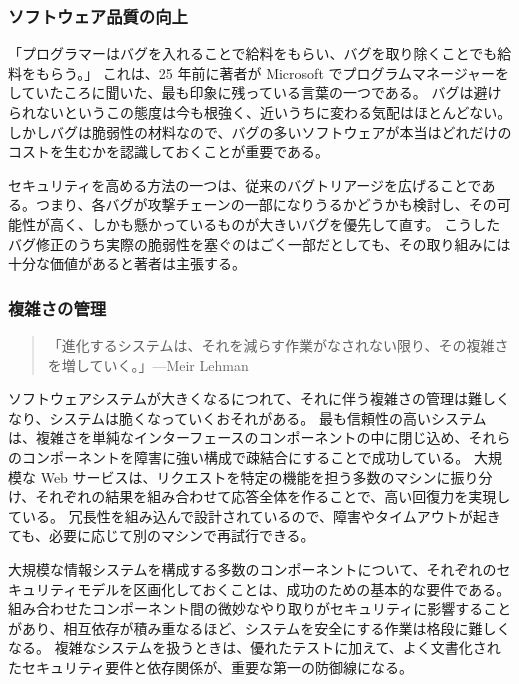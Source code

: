 \documentclass[uplatex]{jsarticle}
\begin{document}
\subsubsection{ソフトウェア品質の向上}

「プログラマーはバグを入れることで給料をもらい、バグを取り除くことでも給料をもらう。」
これは、25 年前に著者が Microsoft でプログラムマネージャーをしていたころに聞いた、最も印象に残っている言葉の一つである。
バグは避けられないというこの態度は今も根強く、近いうちに変わる気配はほとんどない。
しかしバグは脆弱性の材料なので、バグの多いソフトウェアが本当はどれだけのコストを生むかを認識しておくことが重要である。

セキュリティを高める方法の一つは、従来のバグトリアージを広げることである。つまり、各バグが攻撃チェーンの一部になりうるかどうかも検討し、その可能性が高く、しかも懸かっているものが大きいバグを優先して直す。
こうしたバグ修正のうち実際の脆弱性を塞ぐのはごく一部だとしても、その取り組みには十分な価値があると著者は主張する。

\subsubsection{複雑さの管理}

\begin{quote}
「進化するシステムは、それを減らす作業がなされない限り、その複雑さを増していく。」---Meir Lehman
\end{quote}

ソフトウェアシステムが大きくなるにつれて、それに伴う複雑さの管理は難しくなり、システムは脆くなっていくおそれがある。
最も信頼性の高いシステムは、複雑さを単純なインターフェースのコンポーネントの中に閉じ込め、それらのコンポーネントを障害に強い構成で疎結合にすることで成功している。
大規模な Web サービスは、リクエストを特定の機能を担う多数のマシンに振り分け、それぞれの結果を組み合わせて応答全体を作ることで、高い回復力を実現している。
冗長性を組み込んで設計されているので、障害やタイムアウトが起きても、必要に応じて別のマシンで再試行できる。

大規模な情報システムを構成する多数のコンポーネントについて、それぞれのセキュリティモデルを区画化しておくことは、成功のための基本的な要件である。
組み合わせたコンポーネント間の微妙なやり取りがセキュリティに影響することがあり、相互依存が積み重なるほど、システムを安全にする作業は格段に難しくなる。
複雑なシステムを扱うときは、優れたテストに加えて、よく文書化されたセキュリティ要件と依存関係が、重要な第一の防御線になる。
\end{document}
